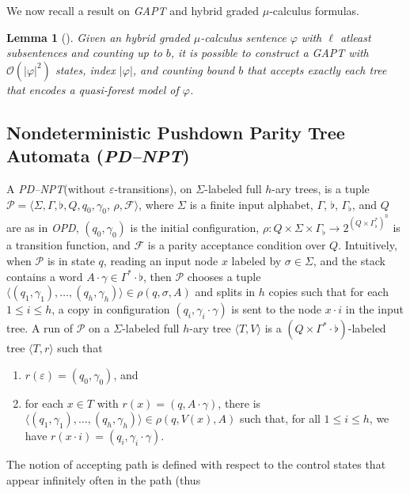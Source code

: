 \documentclass{LMCS}
\theoremstyle{plain}
\def \bottom        {\flat}
\def \F             {\mathcal{F}}
\def \GAPT          {\emph{GAPT}\xspace}
\def \Gb            {\Gamma_{\bottom}}
\def \OPD           {\emph{OPD}\xspace}
\def \P             {\mathcal{P}}
\def \PDNPT         {\emph{PD--NPT}\xspace}
\newcommand \tpl[1] {\langle #1 \rangle}
\newtheorem{lemma}{Lemma}
\begin{document}
We now recall a result on \GAPT and hybrid graded $\mu$-calculus
formulas.

\begin{lemma}[\cite{BLMV06}]\label{lem:FromFormulasToAutomata}
Given an hybrid graded $\mu$-calculus sentence $\varphi$ with $\ell$
\emph{atleast} subsentences and counting up to $b$, it is possible to construct
a \GAPT with $\mathcal{O}(|\varphi|^2)$ states, index $|\varphi|$, and counting
bound $b$ that accepts exactly each tree that encodes a quasi-forest model of
$\varphi$.
\end{lemma}

\subsection{Nondeterministic Pushdown Parity Tree Automata
(\PDNPT)}\label{sub:Pdnpt} A \PDNPT (without $\varepsilon$-transitions), on
$\Sigma$-labeled full $h$-ary trees, is a tuple $\P = \tpl{\Sigma, \Gamma,
\bottom, Q, q_0, \gamma_0$, $\rho,\F}$, where $\Sigma$ is a finite input
alphabet, $\Gamma$, $\bottom$, $\Gb$, and $Q$ are as in \OPD, $(q_0,\gamma_0)$
is the initial configuration, $\rho:Q\times \Sigma \times \Gb \rightarrow 2^{(Q
\times \Gb^*)^h}$ is a transition function, and $\F$ is a parity acceptance
condition over $Q$. Intuitively, when $\P$ is in state $q$, reading an input
node $x$ labeled by $\sigma \in \Sigma$, and the stack contains a word $A \cdot
\gamma \in \Gamma^* \cdot \bottom$, then $\P$ chooses a tuple
$\tpl{(q_1,\gamma_1),\ldots,(q_h,\gamma_h)} \in \rho(q,\sigma,A)$ and splits in
$h$ copies such that for each $1\leq i\leq h$, a copy in configuration $(q_i,
\gamma_i \cdot \gamma)$ is sent to the node $x \cdot i$ in the input tree. A
run of $\P$ on a $\Sigma$-labeled full $h$-ary tree $\tpl{T,V}$ is a $(Q \times
\Gamma^* \cdot \bottom)$-labeled tree $\tpl{T,r}$ such that
\begin{enumerate}[$\bullet$]

  \item
  $r(\varepsilon) = (q_0,\gamma_0)$, and

  \item
  for each $x\in T$ with $r(x)=(q,A\cdot\gamma)$, there is
  $\tpl{(q_1,\gamma_1),\ldots,(q_h,\gamma_h)} \in \rho(q,V(x),A)$
  such that, for all $1\leq i\leq h$, we have $r(x \cdot i) =
  (q_i,\gamma_i \cdot \gamma)$.

\end{enumerate}
The notion of accepting path is defined with respect to the
control states that appear infinitely often in the path (thus
\end{document}
